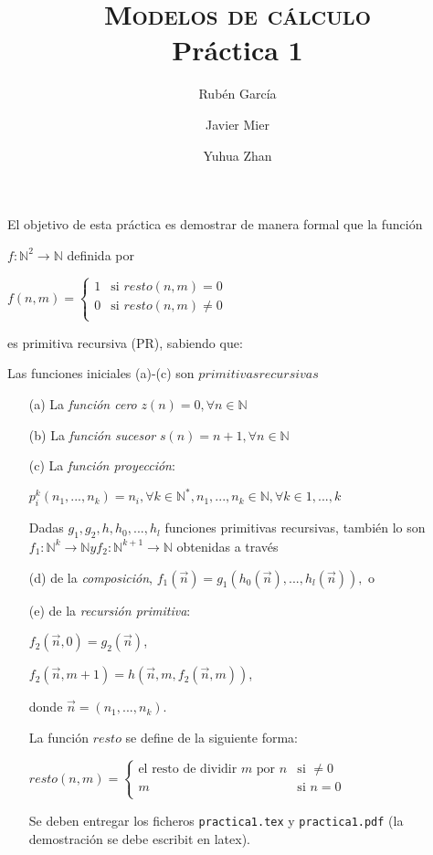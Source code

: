 \documentclass[a4paper,12pt]{article}
\title{\large{\textsc{Modelos de cálculo}} \\ \vspace{-2mm} \Large{Práctica 1}}
\author{Rubén García \and Javier Mier \and Yuhua Zhan}
\date{}
\begin{document}
\maketitle

\thispagestyle{fancy}

El objetivo de esta práctica es demostrar de manera formal que la función

$f: \mathbb{N} ^{2}\rightarrow \mathbb {N}$ definida por

$f(n,m)=\left\{
\begin{array}{cc}
    1&\text{si }resto(n,m) = 0\\
    0&\text{si }resto(n,m) \neq 0\\
\end{array}
\right.$

es primitiva recursiva (PR), sabiendo que:

Las funciones iniciales (a)-(c) son $primitivas recursivas$
\begin{itemize}
\item[(a)] La \textit{función cero} $z(n)=0, \forall n \in \mathbb {N} $
\item [(b)] La \textit{función sucesor} $s(n)=n+1, \forall n \in \mathbb {N} $
\item[(c)] La \textit{función proyección}:

$p^{k}_{i}(n_{1},...,n_{k})=n_{i},\forall k \in \mathbb {N}^{*},n_{1},...,n_{k} \in \mathbb{N}, \forall k \in {1,...,k}$

Dadas $g_1,g_2,h,h_0,...,h_l$
funciones primitivas recursivas, también lo son $f_1 :
\mathbb{N}^{k} \rightarrow \mathbb{N} y f_2: \mathbb{N}^{k+1} \rightarrow \mathbb{N}$ obtenidas a través

\item[(d)] de la \textit{composición}, $f_1(\vec{n}) = g_1(h_0(\vec{n}),...,h_l(\vec{n})),$ o

\item[(e)] de la \textit{recursión primitiva}: 

$f_2(\vec{n},0) = g_2(\vec{n})$,

$f_2(\vec{n},m+1) = h(\vec{n},m,f_2(\vec{n},m))$, 

donde $\vec{n} = (n_{1},...,n_{k})$.

La función $resto$ se define de la siguiente forma:

$resto(n,m)=\left\{
\begin{array}{cc}
    \text{el resto de dividir $m$ por $n$}&\text{si }\neq 0\\
    m&\text{si }n = 0\\
\end{array}
\right.$

Se deben entregar los ficheros \texttt{practica1.tex} y \texttt{practica1.pdf} (la demostración se debe escribit en latex).

\end{itemize}
\end{document}
